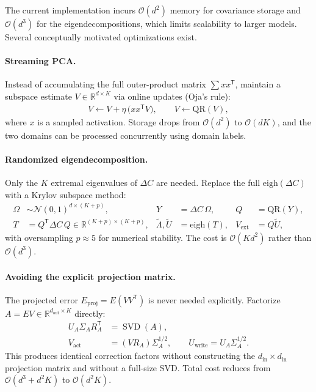 \documentclass[11pt,a4paper]{article}
\DeclareMathOperator{\svd}{SVD}
\begin{document}
The current implementation incurs $\mathcal{O}(d^2)$ memory for
covariance storage and $\mathcal{O}(d^3)$ for the
eigendecompositions, which limits scalability to larger models.
Several conceptually motivated optimizations exist.

\paragraph{Streaming PCA.}
Instead of accumulating the full outer-product matrix $\sum xx^{\mathsf{T}}$,
maintain a subspace estimate $V \in \mathbb{R}^{d \times K}$ via
online updates (Oja's rule):
\begin{align}
  V \leftarrow V + \eta\,\bigl( x x^{\mathsf{T}} V \bigr), \qquad
  V \leftarrow \text{QR}(V),
\end{align}
where $x$ is a sampled activation.  Storage drops from
$\mathcal{O}(d^2)$ to $\mathcal{O}(dK)$, and the two domains can be
processed concurrently using domain labels.

\paragraph{Randomized eigendecomposition.}
Only the $K$ extremal eigenvalues of $\Delta C$ are needed.  Replace
the full $\text{eigh}(\Delta C)$ with a Krylov subspace method:
\begin{align}
  \Omega &\sim \mathcal{N}(0,1)^{d \times (K + p)}, &
  Y &= \Delta C \,\Omega, &
  Q &= \text{QR}(Y), \\
  T &= Q^{\mathsf{T}} \Delta C \, Q \in \mathbb{R}^{(K+p) \times (K+p)}, &
  \tilde\Lambda, \tilde U &= \text{eigh}(T), &
  V_{\text{ext}} &= Q \tilde U,
\end{align}
with oversampling $p \approx 5$ for numerical stability.  The cost is
$\mathcal{O}(K d^2)$ rather than $\mathcal{O}(d^3)$.

\paragraph{Avoiding the explicit projection matrix.}
The projected error $E_{\text{proj}} = E (V V^{\mathsf{T}})$ is never
needed explicitly.  Factorize $A = E V \in \mathbb{R}^{d_{\text{out}}
\times K}$ directly:
\begin{align}
  U_A \Sigma_A R_A^{\mathsf{T}} &= \svd(A), \\
  V_{\text{act}} &= (V R_A) \Sigma_A^{1/2}, \qquad
  U_{\text{write}} = U_A \Sigma_A^{1/2}.
\end{align}
This produces identical correction factors without constructing the
$d_{\text{in}} \times d_{\text{in}}$ projection matrix and without a
full-size SVD.  Total cost reduces from $\mathcal{O}(d^3 + d^2 K)$ to
$\mathcal{O}(d^2 K)$.
\end{document}
